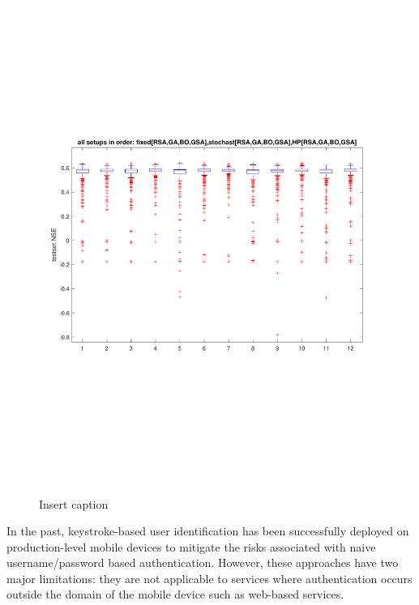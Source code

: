 \documentclass[twocolumn]{article}
\begin{document}
\begin{figure}
	\centering
	\includegraphics{FF_app_skript_boxplot_testset}
	\caption{Insert caption}
\end{figure}

In the past, keystroke-based user identification has been successfully deployed on production-level mobile devices to mitigate the risks associated with naive username/password based authentication. However, these approaches have two major limitations: they are not applicable to services where authentication occurs outside the domain of the mobile
device such as web-based services.





   
\end{document}
